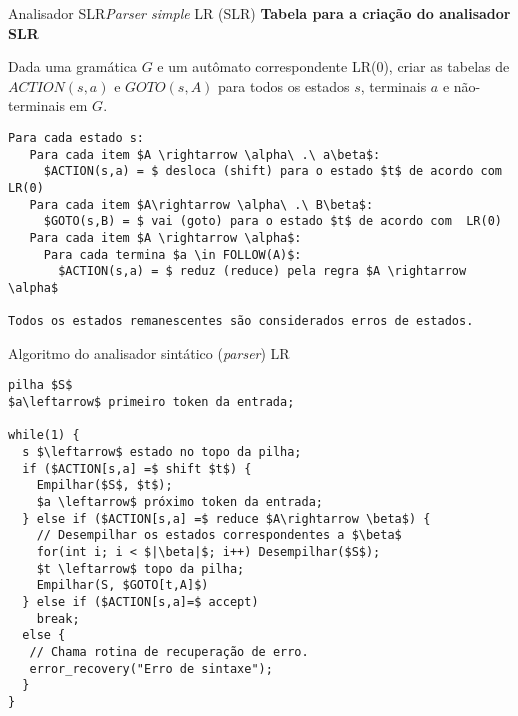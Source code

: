 \begin{frame}[fragile]{Analisador SLR}{{\it Parser simple} LR (SLR)}
\small
{\bf Tabela para a criação do analisador SLR}\bigskip

	Dada uma gramática $G$ e um autômato correspondente LR(0),
	criar as tabelas de $ACTION(s,a)$ e $GOTO(s,A)$ para todos
	os estados $s$, terminais $a$ e não-terminais em $G$.\bigskip

\begin{lstlisting}
Para cada estado s:
   Para cada item $A \rightarrow \alpha\ .\ a\beta$:
     $ACTION(s,a) = $ desloca (shift) para o estado $t$ de acordo com  LR(0)
   Para cada item $A\rightarrow \alpha\ .\ B\beta$:
     $GOTO(s,B) = $ vai (goto) para o estado $t$ de acordo com  LR(0)
   Para cada item $A \rightarrow \alpha$:
     Para cada termina $a \in FOLLOW(A)$:
       $ACTION(s,a) = $ reduz (reduce) pela regra $A \rightarrow \alpha$

Todos os estados remanescentes são considerados erros de estados.
\end{lstlisting}

\end{frame}

\begin{frame}[fragile]{Algoritmo do analisador sintático ({\it parser\/}) LR}

\begin{lstlisting}
pilha $S$
$a\leftarrow$ primeiro token da entrada;

while(1) {
  s $\leftarrow$ estado no topo da pilha;
  if ($ACTION[s,a] =$ shift $t$) {
    Empilhar($S$, $t$);
    $a \leftarrow$ próximo token da entrada;
  } else if ($ACTION[s,a] =$ reduce $A\rightarrow \beta$) {
    // Desempilhar os estados correspondentes a $\beta$
    for(int i; i < $|\beta|$; i++) Desempilhar($S$);
    $t \leftarrow$ topo da pilha;
    Empilhar(S, $GOTO[t,A]$)
  } else if ($ACTION[s,a]=$ accept)
    break;
  else {
   // Chama rotina de recuperação de erro.
   error_recovery("Erro de sintaxe");
  }
}
\end{lstlisting}

\end{frame}


